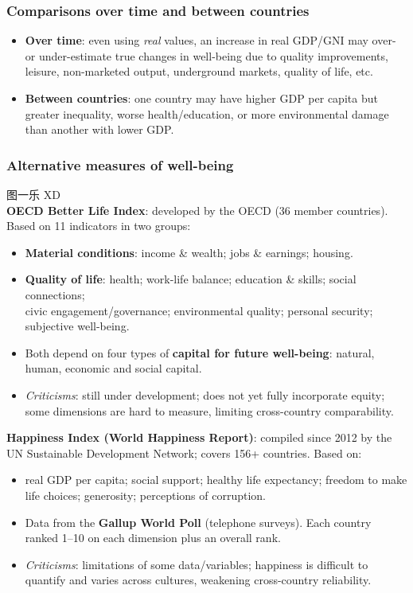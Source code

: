 \subsubsection*{Comparisons over time and between countries}
\begin{itemize}
  \item \textbf{Over time}: even using \textit{real} values, an increase in real GDP/GNI may over- or under-estimate true changes in well-being due to quality improvements, leisure, non-marketed output, underground markets, quality of life, etc.
  \item \textbf{Between countries}: one country may have higher GDP per capita but greater inequality, worse health/education, or more environmental damage than another with lower GDP.
\end{itemize}
\subsubsection*{Alternative measures of well-being}
图一乐 XD\\
\textbf{OECD Better Life Index}: developed by the OECD (36 member countries). Based on 11 indicators in two groups:
\begin{itemize}
  \item \textbf{Material conditions}: income \& wealth; jobs \& earnings; housing.
  \item \textbf{Quality of life}: health; work-life balance; education \& skills; social connections; \\civic engagement/governance; environmental quality; personal security; subjective well-being.
  \item Both depend on four types of \textbf{capital for future well-being}: natural, human, economic and social capital.
  \item \textit{Criticisms}: still under development; does not yet fully incorporate equity; some dimensions are hard to measure, limiting cross-country comparability.
\end{itemize}
\textbf{Happiness Index (World Happiness Report)}: compiled since 2012 by the UN Sustainable Development Network; covers 156+ countries. Based on:
\begin{itemize}
  \item real GDP per capita; social support; healthy life expectancy; freedom to make life choices; generosity; perceptions of corruption.
  \item Data from the \textbf{Gallup World Poll} (telephone surveys). Each country ranked 1--10 on each dimension plus an overall rank.
  \item \textit{Criticisms}: limitations of some data/variables; happiness is difficult to quantify and varies across cultures, weakening cross-country reliability.
\end{itemize}
